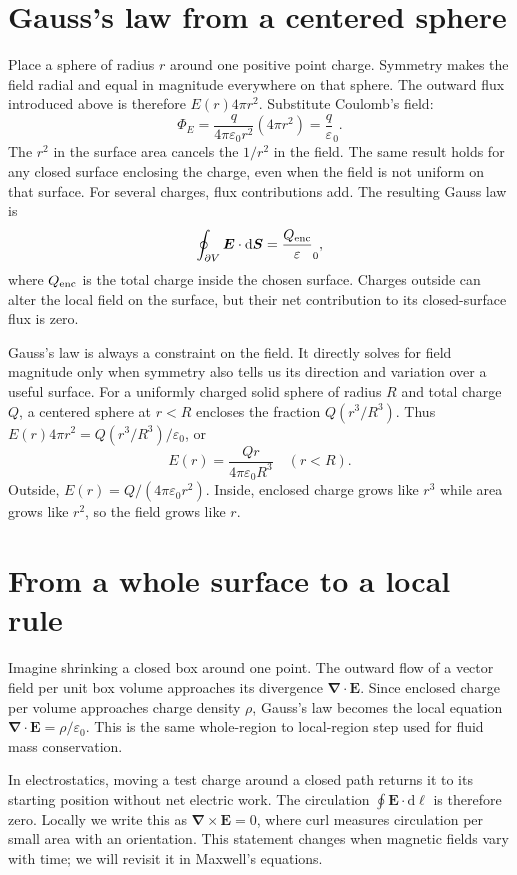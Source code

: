 \documentclass[11pt,oneside]{book}
\newcommand{\dd}{\mathrm{d}}
\newcommand{\vect}[1]{\boldsymbol{#1}}
\newcommand{\grad}{\boldsymbol{\nabla}}
\newcommand{\eps}{\varepsilon_0}
\theoremstyle{reviewstyle}
\begin{document}
\section{Gauss's law from a centered sphere}
Place a sphere of radius $r$ around one positive point charge. Symmetry makes the field radial and equal in magnitude everywhere on that sphere. The outward flux introduced above is therefore $E(r)4\pi r^2$. Substitute Coulomb's field:
\begin{equation}
\Phi_E=\frac{q}{4\pi\eps r^2}(4\pi r^2)=\frac q\eps.
\end{equation}
The $r^2$ in the surface area cancels the $1/r^2$ in the field. The same result holds for any closed surface enclosing the charge, even when the field is not uniform on that surface. For several charges, flux contributions add. The resulting Gauss law is
\begin{equation}
\oint_{\partial V}\vect E\cdot\dd\vect S=\frac{Q_{\rm enc}}\eps,
\end{equation}
where $Q_{\rm enc}$ is the total charge inside the chosen surface. Charges outside can alter the local field on the surface, but their net contribution to its closed-surface flux is zero.

Gauss's law is always a constraint on the field. It directly solves for field magnitude only when symmetry also tells us its direction and variation over a useful surface. For a uniformly charged solid sphere of radius $R$ and total charge $Q$, a centered sphere at $r<R$ encloses the fraction $Q(r^3/R^3)$. Thus $E(r)4\pi r^2=Q(r^3/R^3)/\eps$, or
\begin{equation}
E(r)=\frac{Qr}{4\pi\eps R^3}\quad(r<R).
\end{equation}
Outside, $E(r)=Q/(4\pi\eps r^2)$. Inside, enclosed charge grows like $r^3$ while area grows like $r^2$, so the field grows like $r$.

\section{From a whole surface to a local rule}
Imagine shrinking a closed box around one point. The outward flow of a vector field per unit box volume approaches its divergence $\grad\cdot\vect E$. Since enclosed charge per volume approaches charge density $\rho$, Gauss's law becomes the local equation $\grad\cdot\vect E=\rho/\eps$. This is the same whole-region to local-region step used for fluid mass conservation.

In electrostatics, moving a test charge around a closed path returns it to its starting position without net electric work. The circulation $\oint\vect E\cdot\dd\vect\ell$ is therefore zero. Locally we write this as $\grad\times\vect E=0$, where curl measures circulation per small area with an orientation. This statement changes when magnetic fields vary with time; we will revisit it in Maxwell's equations.
\end{document}
